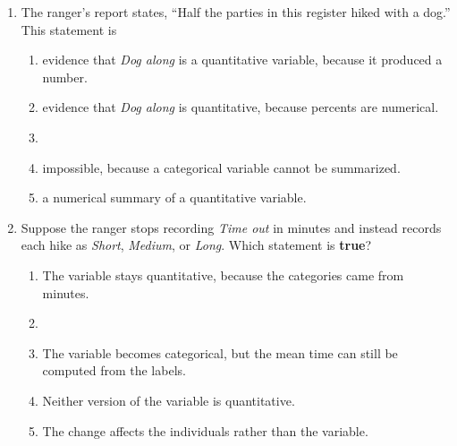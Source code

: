 \begin{enumerate}[leftmargin=1.9em, itemsep=0.14in]
  \item The ranger's report states, ``Half the parties in this register hiked with a dog.''
        This statement is
        \begin{enumerate}[label=\textbf{(\Alph*)}, leftmargin=2.2em, itemsep=3pt]
          \item evidence that \emph{Dog along} is a quantitative variable, because it produced
                a number.
          \item evidence that \emph{Dog along} is quantitative, because percents are numerical.
          \item {}
          \item impossible, because a categorical variable cannot be summarized.
          \item a numerical summary of a quantitative variable.
                \hfill{}
        \end{enumerate}

  \item Suppose the ranger stops recording \emph{Time out} in minutes and instead records each
        hike as \emph{Short}, \emph{Medium}, or \emph{Long}. Which statement is \textbf{true}?
        \begin{enumerate}[label=\textbf{(\Alph*)}, leftmargin=2.2em, itemsep=3pt]
          \item The variable stays quantitative, because the categories came from minutes.
          \item {}
          \item The variable becomes categorical, but the mean time can still be computed from
                the labels.
          \item Neither version of the variable is quantitative.
          \item The change affects the individuals rather than the variable.
                \hfill{}
        \end{enumerate}

\end{enumerate}

\vspace{0.14in}

